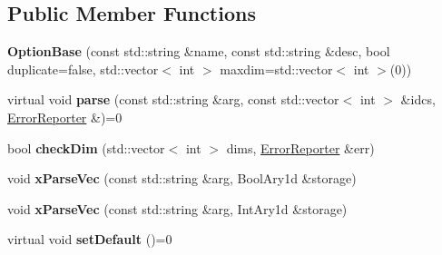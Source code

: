 \subsection*{Public Member Functions}
\begin{DoxyCompactItemize}
\item 
\mbox{\label{structdf_1_1program__options__lite_1_1_option_base_ae2064404892b02b2da01c3dcc4428a1f}} 
{\bfseries Option\+Base} (const std\+::string \&name, const std\+::string \&desc, bool duplicate=false, std\+::vector$<$ int $>$ maxdim=std\+::vector$<$ int $>$(0))
\item 
\mbox{\label{structdf_1_1program__options__lite_1_1_option_base_a703dc431b1fa8bca97808e98cbd32ebb}} 
virtual void {\bfseries parse} (const std\+::string \&arg, const std\+::vector$<$ int $>$ \&idcs, \hyperlink{structdf_1_1program__options__lite_1_1_error_reporter}{Error\+Reporter} \&)=0
\item 
\mbox{\label{structdf_1_1program__options__lite_1_1_option_base_ad3d25c54abf2c0d1d8146fe30cef1516}} 
bool {\bfseries check\+Dim} (std\+::vector$<$ int $>$ dims, \hyperlink{structdf_1_1program__options__lite_1_1_error_reporter}{Error\+Reporter} \&err)
\item 
\mbox{\label{structdf_1_1program__options__lite_1_1_option_base_a9455c046218bee77d70ca4fe86757813}} 
void {\bfseries x\+Parse\+Vec} (const std\+::string \&arg, Bool\+Ary1d \&storage)
\item 
\mbox{\label{structdf_1_1program__options__lite_1_1_option_base_ae02e8bb720630aec3ea34731f27f638c}} 
void {\bfseries x\+Parse\+Vec} (const std\+::string \&arg, Int\+Ary1d \&storage)
\item 
\mbox{\label{structdf_1_1program__options__lite_1_1_option_base_a982c89928b3f6634546b5f0a7ee305f4}} 
virtual void {\bfseries set\+Default} ()=0
\end{DoxyCompactItemize}
